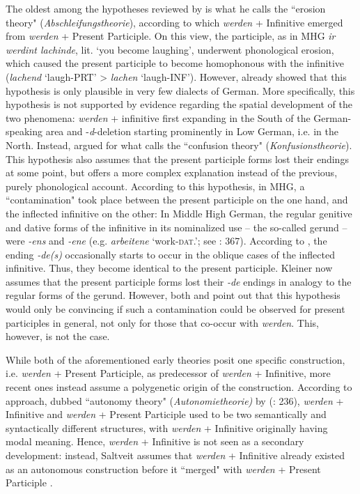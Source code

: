 \documentclass[output=paper,colorlinks,citecolor=brown]{langscibook}
\begin{document}
\noindent The oldest among the hypotheses reviewed by \citet[]{Westvik2000} is what he calls the ``erosion theory" (\textit{Abschleifungstheorie}), according to which \textit{werden} + Infinitive emerged from \textit{werden} + Present Participle. On this view, the participle, as in MHG \textit{ir werdint lachinde}, lit. `you become laughing', underwent phonological erosion, which caused the present participle to become homophonous with the infinitive (\textit{lachend} `laugh-\textsc{PRT}' > \textit{lachen} `laugh-\textsc{INF}'). However, \citet{Kleiner1925} already showed that this hypothesis is only plausible in very few dialects of German. More specifically, this hypothesis is not supported by evidence regarding the spatial development of the two phenomena: \textit{werden} + infinitive first expanding in the South of the German-speaking area and -\textit{d}-deletion starting prominently in Low German, i.e. in the North. Instead, \citet[]{Kleiner1925}{} argued for what \citet[236]{Westvik2000}{} calls the ``confusion theory" (\textit{Konfusionstheorie}). This hypothesis also assumes that the present participle forms lost their endings at some point, but offers a more complex explanation instead of the previous, purely phonological account. According to this hypothesis, in MHG, a ``contamination" took place between the present participle on the one hand, and the inflected infinitive on the other: In Middle High German, the regular genitive and dative forms of the infinitive in its nominalized use -- the so-called gerund -- were \textit{-ens} and \textit{-ene} (e.g. \textit{arbeitene} `work-\textsc{dat}.'; see \citeauthor{Hartmann2021} \citeyear{Hartmann2021}: 367). According to \citet[58]{Kleiner1925}{}, the ending \textit{-de(s)} occasionally starts to occur in the oblique cases of the inflected infinitive. Thus, they become identical to the present participle. Kleiner now assumes that the present participle forms lost their \textit{-de} endings in analogy to the regular forms of the gerund. However, both \citet[7]{Schmid2000}{} and \citet[325]{pfefferkornPeriphrastischenFuturformenIm2005}{} point out that this hypothesis would only be convincing if such a contamination could be observed for present participles in general, not only for those that co-occur with \textit{werden}. This, however, is not the case. 

While both of the aforementioned early theories posit one specific construction, i.e. \textit{werden} + Present Participle, as predecessor of \textit{werden} + Infinitive, more recent ones instead assume a polygenetic origin of the construction. According to  approach, dubbed ``autonomy theory" (\textit{Autonomietheorie)} by \citeauthor{Westvik2000} (\citeyear{Westvik2000}: 236), \textit{werden} + Infinitive and \textit{werden} + Present Participle used to be two semantically and syntactically different structures, with \textit{werden} + Infinitive originally having modal meaning. Hence, \textit{werden} + Infinitive is not seen as a secondary development: instead, Saltveit assumes that \textit{werden} + Infinitive already existed as an autonomous construction before it ``merged" with \textit{werden} + Present Participle \citep[see][236]{Westvik2000}{}{}.  
\end{document}
